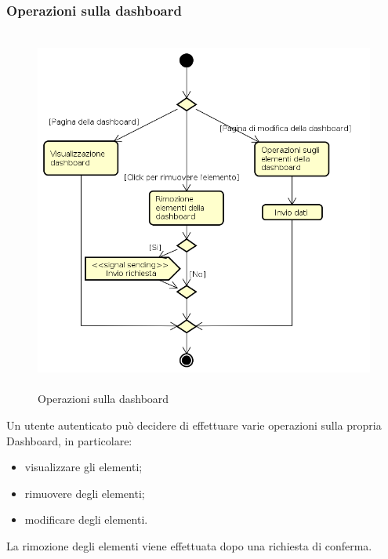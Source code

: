 \subsubsection{Operazioni sulla dashboard}
\begin{figure}[H]
\begin{center}
\includegraphics[height=12cm]{res/sections/backend/activities/operazioniDashboard.png}
\caption{Operazioni sulla dashboard}
\end{center}
\end{figure}
Un utente autenticato può decidere di effettuare varie operazioni sulla propria Dashboard, in particolare:
\begin{itemize}
\item visualizzare gli elementi;
\item rimuovere degli elementi;
\item modificare degli elementi.
\end{itemize}
La rimozione degli elementi viene effettuata dopo una richiesta di conferma.
